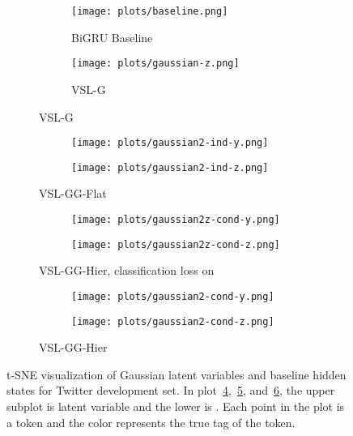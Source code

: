 \documentclass[11pt,a4paper]{article}
\newcommand{\vsmg}{VSL-G\xspace}
\newcommand{\vsmggflat}{VSL-GG-Flat\xspace}
\newcommand{\vsmgghier}{VSL-GG-Hier\xspace}
\begin{document}
\begin{figure}[t]
    \centering
    \begin{subfigure}{.25\textwidth}
        \begin{subfigure}{\textwidth}
        \centering
            \texttt{[image: plots/baseline.png]}
             \caption{BiGRU Baseline\label{fig:tsne-bigru}}
        \end{subfigure}
        \begin{subfigure}{\textwidth}
        \centering
        \texttt{[image: plots/gaussian-z.png]}
         \caption{\vsmg\label{fig:tsne-gauss}}
        \end{subfigure}
    \end{subfigure}\begin{subfigure}{.25\textwidth}
    \centering
        \begin{subfigure}{.9\textwidth}
        \texttt{[image: plots/gaussian2-ind-y.png]}
        \end{subfigure}
        \begin{subfigure}{.9\textwidth}
        \texttt{[image: plots/gaussian2-ind-z.png]}
        \end{subfigure}
     \caption{\vsmggflat \label{fig:tsne-2gind}}
    \end{subfigure}
    \begin{subfigure}{.25\textwidth}
    \centering
        \begin{subfigure}{.9\textwidth}
        \texttt{[image: plots/gaussian2z-cond-y.png]}
        \end{subfigure}
        \begin{subfigure}{.9\textwidth}
        \texttt{[image: plots/gaussian2z-cond-z.png]}
        \end{subfigure}
     \caption{\vsmgghier, classification loss on   \label{fig:tsne-2gdepz}}
    \end{subfigure}\begin{subfigure}{.25\textwidth}
    \centering
        \begin{subfigure}{.9\textwidth}
        \texttt{[image: plots/gaussian2-cond-y.png]}
        \end{subfigure}
        \begin{subfigure}{.9\textwidth}
        \texttt{[image: plots/gaussian2-cond-z.png]}
        \end{subfigure}
     \caption{\vsmgghier \label{fig:tsne-2gdep}}
    \end{subfigure}
\caption{t-SNE visualization of Gaussian latent variables and baseline hidden states for Twitter development set. In plot~\ref{fig:tsne-2gind},~\ref{fig:tsne-2gdepz},  and~\ref{fig:tsne-2gdep}, the upper subplot is latent variable  and the lower is . Each point in the plot is a token and the color represents the true tag of the token.}
\label{fig:gauss_lv}
\end{figure}
\end{document}
